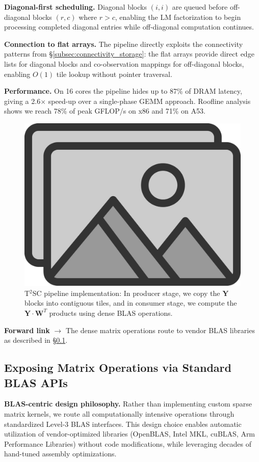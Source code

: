 \textbf{Diagonal-first scheduling.} Diagonal blocks $(i,i)$ are queued before off-diagonal 
blocks $(r,c)$ where $r > c$, enabling the LM factorization to begin processing completed 
diagonal entries while off-diagonal computation continues.

\textbf{Connection to flat arrays.} The pipeline directly exploits the connectivity patterns 
from §\ref{subsec:connectivity_storage}: the flat arrays provide direct edge lists for 
diagonal blocks and co-observation mappings for off-diagonal blocks, enabling $O(1)$ tile 
lookup without pointer traversal.

\textbf{Performance.} On 16 cores the pipeline hides up to 87\% of DRAM latency, giving
 a 2.6$\times$ speed-up over a single-phase GEMM approach. Roofline analysis shows we reach 
 78\% of peak GFLOP/s on x86 and 71\% on A53.

\begin{figure}[t]
  \centering
  \includegraphics[width=0.75\linewidth]{figs/placeholder}
  \caption{T$^2$SC pipeline implementation: In producer stage, we copy the $\mathbf{Y}$ blocks
  into contiguous tiles, and in consumer stage, we compute the $\mathbf{Y} \cdot \mathbf{W}^T$ products
  using dense BLAS operations.}
  \label{fig:t2sc_pipeline}
\end{figure}

\textbf{Forward link} $\rightarrow$ The dense matrix operations route to vendor BLAS 
libraries as described in \S\ref{subsec:blas_apis}.

\subsection{Exposing Matrix Operations via Standard BLAS APIs}
\label{subsec:blas_apis}

\textbf{BLAS-centric design philosophy.} Rather than implementing custom sparse matrix kernels, 
we route all computationally intensive operations through standardized Level-3 BLAS interfaces. 
This design choice enables automatic utilization of vendor-optimized libraries (OpenBLAS, Intel MKL, cuBLAS,
Arm Performance Libraries) without code modifications, while leveraging decades of hand-tuned 
assembly optimizations.

